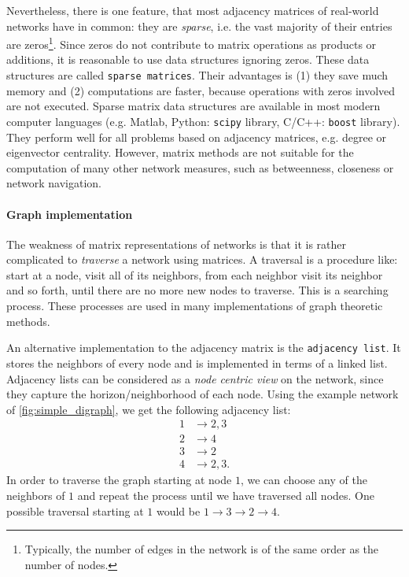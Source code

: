 Nevertheless, there is one feature, that most adjacency matrices of real-world networks have in common:
they are \emph{sparse}, i.e. the vast majority of their entries are zeros\footnote{Typically, the number of edges in the network is of the same order as the number of nodes.}.
Since zeros do not contribute to matrix operations as products or additions, it is reasonable to use data structures ignoring zeros.
These data structures are called \verb"sparse matrices".
Their advantages is (1) they save much memory and (2) computations are faster, because operations with zeros involved are not executed.
Sparse matrix data structures are available in most modern computer languages (e.g. Matlab, Python: \verb"scipy" library, C/C++: \verb"boost" library).
They perform well for all problems based on adjacency matrices, e.g. degree or eigenvector centrality.
However, matrix methods are not suitable for the computation of many other network measures, such as betweenness, closeness or network navigation.

\paragraph{Graph implementation\color{Cayenne}{.}}
The weakness of matrix representations of networks is that it is rather complicated to \emph{traverse} a network using matrices.
A traversal is a procedure like: start at a node, visit all of its neighbors, from each neighbor visit its neighbor and so forth, until there are no more new nodes to traverse.
This is a searching process.
These processes are used in many implementations of graph theoretic methods.

An alternative implementation to the adjacency matrix is the \verb"adjacency list".
It stores the neighbors of every node and is implemented in terms of a linked list.
Adjacency lists can be considered as a \emph{node centric view} on the network, since they capture the horizon/neighborhood of each node.
Using the example network of \ref{fig:simple_digraph}, we get the following adjacency list:
\begin{align*}
1 &\rightarrow 2,3 \\
2 &\rightarrow 4 \\
3 &\rightarrow 2 \\
4 &\rightarrow 2,3 .
\end{align*}
In order to traverse the graph starting at node $1$, we can choose any of the neighbors of $1$ and repeat the process until we have traversed all nodes.
One possible traversal starting at $1$ would be $1\rightarrow 3 \rightarrow 2 \rightarrow 4$.

